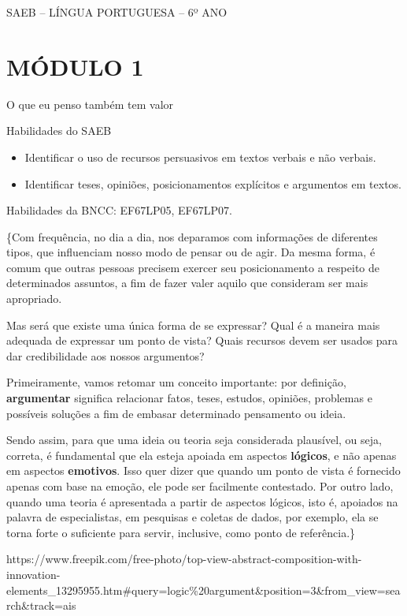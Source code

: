 SAEB -- LÍNGUA PORTUGUESA -- 6º ANO

\hypertarget{muxf3dulo-1}{%
\section{MÓDULO 1}\label{muxf3dulo-1}}

O que eu penso também tem valor

Habilidades do SAEB

\begin{itemize}
\tightlist
\item
  Identificar o uso de recursos persuasivos em textos verbais e não
  verbais.
\item
  Identificar teses, opiniões, posicionamentos explícitos e argumentos
  em textos.
\end{itemize}

Habilidades da BNCC: EF67LP05, EF67LP07.

\conteudo

\{Com frequência, no dia a dia, nos deparamos com informações de
diferentes tipos, que influenciam nosso modo de pensar ou de agir. Da
mesma forma, é comum que outras pessoas precisem exercer seu
posicionamento a respeito de determinados assuntos, a fim de fazer valer
aquilo que consideram ser mais apropriado.

Mas será que existe uma única forma de se expressar? Qual é a maneira
mais adequada de expressar um ponto de vista? Quais recursos devem ser
usados para dar credibilidade aos nossos argumentos?

Primeiramente, vamos retomar um conceito importante: por definição,
\textbf{argumentar} significa relacionar fatos, teses, estudos,
opiniões, problemas e possíveis soluções a fim de embasar determinado
pensamento ou ideia.

Sendo assim, para que uma ideia ou teoria seja considerada plausível, ou
seja, correta, é fundamental que ela esteja apoiada em aspectos
\textbf{lógicos}, e não apenas em aspectos \textbf{emotivos}. Isso quer
dizer que quando um ponto de vista é fornecido apenas com base na
emoção, ele pode ser facilmente contestado. Por outro lado, quando uma
teoria é apresentada a partir de aspectos lógicos, isto é, apoiados na
palavra de especialistas, em pesquisas e coletas de dados, por exemplo,
ela se torna forte o suficiente para servir, inclusive, como ponto de
referência.\}

https://www.freepik.com/free-photo/top-view-abstract-composition-with-innovation-elements\_13295955.htm\#query=logic\%20argument\&position=3\&from\_view=search\&track=ais

